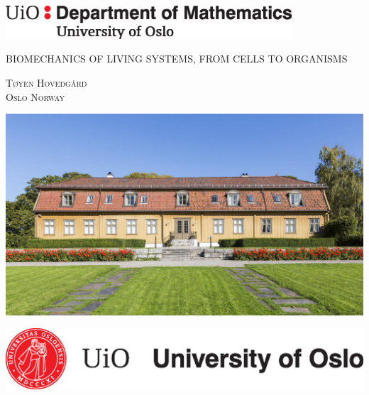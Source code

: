 \documentclass{article}
\begin{document}
\newenvironment{changemargin}[2]{%
\begin{list}{}{%
\setlength{\topsep}{0pt}%
\setlength{\leftmargin}{#1}%
\setlength{\rightmargin}{#2}%
\setlength{\listparindent}{\parindent}%
\setlength{\itemindent}{\parindent}%
\setlength{\parsep}{\parskip}%
}%
\item[]}{\end{list}}

\begin{titlepage}
	\centering
	\includegraphics[width=0.8\textwidth]{img/mat-mn-navn-eng.eps}\par\vspace{1cm}
	{\scshape\LARGE BIOMECHANICS OF LIVING SYSTEMS, FROM CELLS TO ORGANISMS \par}
	\vspace{1cm}
	{\scshape\Large Tøyen Hovedgård \\ Oslo Norway\par}
	\vspace{1.5cm}

\begin{changemargin}{-1cm}{-1cm}

\includegraphics[scale=0.4]{img/hoved.jpg}
\centering
\vspace{0.5cm}

\vspace{0.5cm}



\includegraphics[scale=0.45]{01-UiO-Hovedlogo/English/UiO_Seal_B_ENG_cmyk.eps}\hspace*{2cm}

\end{changemargin}

	\vfill


\end{titlepage}
\end{document}
